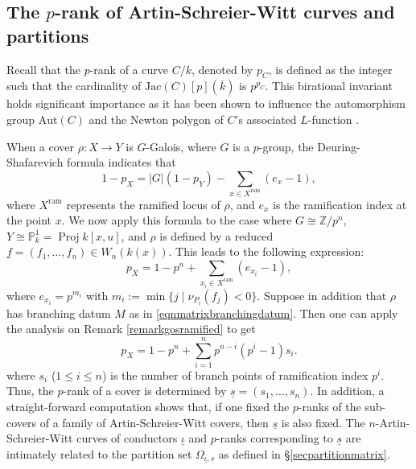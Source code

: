 \documentclass{compositio}
\newcommand{\mat}[1]{\todo[color=green]{MH: #1}}
\theoremstyle{remark}
\theoremstyle{remark}
\DeclareMathOperator{\ram}{ram}
\DeclareMathOperator{\Proj}{Proj}
\begin{document}
     
    
\subsection{The \texorpdfstring{$p$}{p}-rank of Artin-Schreier-Witt curves and partitions}   
\label{secmatrixASW}

Recall that the $p$-rank of a curve $C/k$, denoted by $p_C$, is defined as the integer such that the cardinality of $\text{Jac}(C)[p](\overline{k})$ is $p^{p_C}$. This birational invariant holds significant importance as it has been shown to influence the automorphism group $\text{Aut}(C)$ \cite{MR902787} and the Newton polygon of $C$'s associated $L$-function \cite{MR3287680}. 


When a cover $\rho: X \xrightarrow{} Y$ is $G$-Galois, where $G$ is a $p$-group, the Deuring-Shafarevich formula  \cite[Corollary 1.8]{MR742696} indicates that
\begin{equation}
    \label{eqndeuringshafarevich}
    1-p_X= \lvert G \rvert (1-p_Y)-\sum_{x \in X^{\ram}} (e_x-1),
\end{equation}
where $X^{\ram}$ represents the ramified locus of $\rho$, and $e_x$ is the ramification index at the point $x$. We now apply this formula to the case where $G \cong \mathbb{Z}/p^n$, $Y \cong \mathbb{P}^1_k = \Proj k[x,u]$, and $\rho$ is defined by a reduced $\underline{f}=(f_1, \ldots, f_n) \in W_n(k(x))$. This leads to the following expression:
\[ p_X=1-p^n+\sum_{x_i \in X^{\ram}}(e_{x_i}-1), \]
where $e_{x_i}=p^{m_i}$ with $m_i:=\min \{j \mid \nu_{P_i}(f_j) <0 \}$. Suppose in addition that $\rho$ has branching datum $M$ as in \eqref{eqnmatrixbranchingdatum}. Then one can apply the analysis on Remark \ref{remarkgosramified} to get
\begin{equation}
    \label{eqnprank}
    p_X=1-p^n+\sum_{i=1}^{n} p^{n-i}(p^i-1)s_i. 
\end{equation}
where $s_i$ ($1 \le i \le n$) is the number of branch points of ramification index $p^i$. Thus, the $p$-rank of a cover is determined by $\underline{s}=(s_1, \ldots, s_n)$. 
In addition, a straight-forward computation shows that, if one fixed the $p$-ranks of the sub-covers of a family of Artin-Schreier-Witt covers, then $\underline{s}$ is also fixed. The $n$-Artin-Schreier-Witt curves of conductors $\underline{\iota}$ and $p$-ranks corresponding to $\underline{s}$ are intimately related to the partition set $\Omega_{\underline{\iota}, \underline{s}}$ as defined in \S \ref{secpartitionmatrix}.
\end{document}
